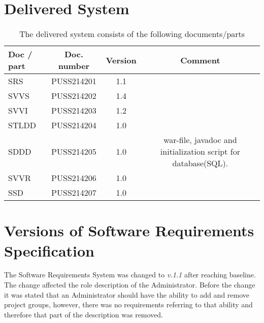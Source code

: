 \documentclass{article}
\begin{document}
\section{Delivered System}
 \begin{table}[h]
            \centering
            
             
            \begin{tabular}{|l|c|c|c|}
                \hline
                    \textbf{Doc / part} & \textbf{Doc.  number} & \textbf{Version} & \textbf{Comment} \\
                \hline
                    SRS & PUSS214201 & 1.1 &   \\
                 \hline
                    SVVS & PUSS214202 & 1.4 &  \\
                 \hline
                    SVVI & PUSS214203 & 1.2 &  \\
                 \hline
                    STLDD & PUSS214204 & 1.0 &  \\
                 \hline
                    SDDD & PUSS214205  & 1.0 & war-file, javadoc and initialization script for database(SQL).   \\

                 \hline
                    SVVR & PUSS214206 & 1.0 &  \\
                    
                 \hline
                    SSD & PUSS214207 & 1.0 &  \\
                 \hline
                 
            \end{tabular}
            \caption{The delivered system consists of the following documents/parts}
           
            \label{activitytable}
        \end{table}
        
        \section{Versions of Software Requirements Specification}
        The Software Requirements System was changed to \textit{v.1.1} after reaching baseline. The change affected the role description of the Administrator. Before the change it was stated that an Administrator should have the ability to add and remove project groups, however, there was no requirements referring to that ability and therefore that part of the description was removed.
        
\end{document}
